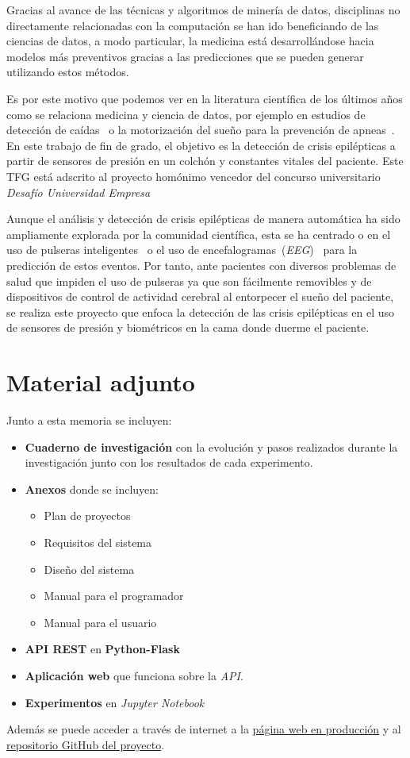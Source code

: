 
Gracias al avance de las técnicas y algoritmos de minería de datos, disciplinas no directamente relacionadas con la computación se han ido beneficiando de las ciencias de datos, a modo particular, la medicina está desarrollándose hacia modelos más preventivos gracias a las predicciones que se pueden generar utilizando estos métodos.

Es por este motivo que podemos ver en la literatura científica de los últimos años como se relaciona medicina y ciencia de datos, por ejemplo en estudios de detección de caídas~\cite{tolkiehn2011fall} o la motorización del sueño para la prevención de apneas~\cite{kortelainen2012sleepmonitoring}. En este trabajo de fin de grado, el objetivo es la detección de crisis epilépticas a partir de sensores de presión en un colchón y constantes vitales del paciente. Este TFG está adscrito al proyecto homónimo vencedor del concurso universitario \textit{Desafío Universidad Empresa}~\cite{radio:radio_amiga_burgos_2018}

Aunque el análisis y detección de crisis epilépticas de manera automática ha sido ampliamente explorada por la comunidad científica, esta se ha centrado o en el uso de pulseras inteligentes~\cite{ramgopal2014product_review} o el uso de encefalogramas~(\textit{EEG})~\cite{jeppesen2017modified,kumar2014epilepticeeg,tzallas2012review} para la predicción de estos eventos. Por tanto, ante pacientes con diversos problemas de salud que impiden el uso de pulseras ya que son fácilmente removibles y de dispositivos de control de actividad cerebral al entorpecer el sueño del paciente, se realiza este proyecto que enfoca la detección de las crisis epilépticas en el uso de sensores de presión y biométricos en la cama donde duerme el paciente.

\section{Material adjunto}
Junto a esta memoria se incluyen:

\begin{itemize}
	\item \textbf{Cuaderno de investigación} con la evolución y pasos realizados durante la investigación junto con los resultados de cada experimento.
	\item \textbf{Anexos} donde se incluyen:
		\begin{itemize}
			\item Plan de proyectos
			\item Requisitos del sistema
			\item Diseño del sistema
			\item Manual para el programador
			\item Manual para el usuario
		\end{itemize}
	\item \textbf{API REST} en \textbf{Python-Flask}
	\item \textbf{Aplicación web} que funciona sobre la \textit{API}.
	\item \textbf{Experimentos} en \textit{Jupyter Notebook}
\end{itemize}

Además se puede acceder a través de internet a la \href{https://ubu.joselucross.com}{ página web en producción} y al \href{https://github.com/jlgarridol/TFG-Smartbeds}{repositorio GitHub del proyecto}.